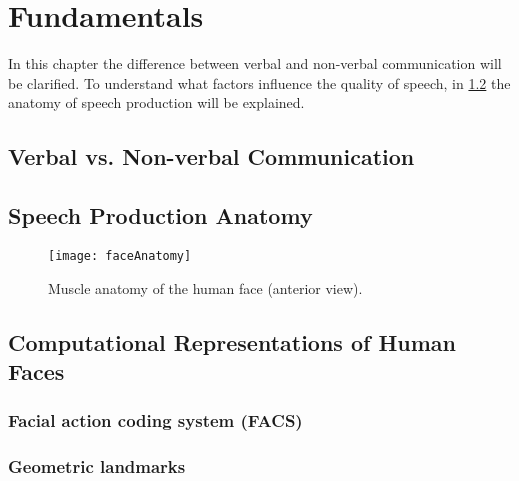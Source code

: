 \chapter{Fundamentals}
\label{cha:fundamentals}

In this chapter the difference between verbal and non-verbal communication will be clarified. To understand what factors influence the quality of speech, in \ref{sec:anatomy} the anatomy of speech production will be explained.  



\section{Verbal vs. Non-verbal Communication} %
\label{sec:communication}


\section{Speech Production Anatomy} %
\label{sec:anatomy}

\begin{figure}
    \centering
    \texttt{[image: faceAnatomy]}
    \caption{Muscle anatomy of the human face (anterior view).\cite{FaceMuscles}}
    \label{fig:my_label}
\end{figure}

\section{Computational Representations of Human Faces}

\subsection{Facial action coding system (FACS)}




\subsection{Geometric landmarks}

